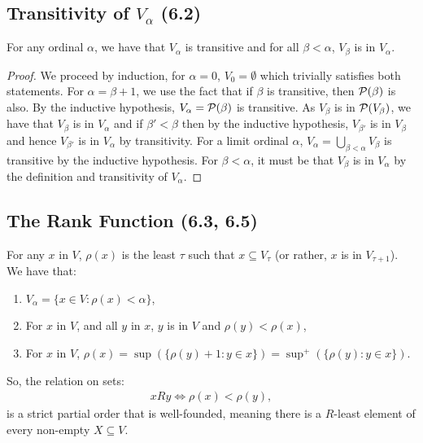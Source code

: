 \subsection{Transitivity of $V_\alpha$ (6.2)} \label{6.2}

For any ordinal $\alpha$, we have that $V_\alpha$ is transitive and for all
$\beta < \alpha$, $V_\beta$ is in $V_\alpha$.

\begin{proof}
    We proceed by induction, for $\alpha = 0$, $V_0 = \emptyset$
    which trivially satisfies both statements. For $\alpha = \beta + 1$,
    we use the fact that if $\beta$ is transitive, then $\mathcal{P}(\beta)$
    is also. By the inductive hypothesis, $V_\alpha = \mathcal{P}(\beta)$
    is transitive. As $V_\beta$ is in $\mathcal{P}(V_\beta)$, we have that
    $V_\beta$ is in $V_\alpha$ and if $\beta' < \beta$ then
    by the inductive hypothesis, $V_{\beta'}$ is in $V_{\beta}$ and
    hence $V_{\beta'}$ is in $V_\alpha$ by transitivity. 
    For a limit ordinal $\alpha$,
    $V_\alpha = \bigcup_{\beta < \alpha} V_\beta$ is transitive by
    the inductive hypothesis. For $\beta < \alpha$, it must be that
    $V_\beta$ is in $V_\alpha$ by the definition and transitivity 
    of $V_\alpha$.
\end{proof}

\subsection{The Rank Function (6.3, 6.5)} \label{6.3} \label{6.5}

For any $x$ in $V$, $\rho(x)$ is the least 
$\tau$ such that $x \subseteq V_\tau$ (or rather, $x$ is in $V_{\tau + 1}$). 
We have that: \begin{enumerate}
    \item $V_\alpha = \{x \in V : \rho(x) < \alpha\}$,
    \item For $x$ in $V$, and all $y$ in $x$, $y$ is in $V$ and
        $\rho(y) < \rho(x)$,
    \item For $x$ in $V$, $\rho(x) 
        = \sup(\{\rho(y) + 1 : y \in x\})
        = \sup^+(\{\rho(y) : y \in x\})$.
\end{enumerate} So, the relation on sets: \begin{align*}
    xRy \Longleftrightarrow \rho(x) < \rho(y),
\end{align*} is a strict partial order that is well-founded, meaning
there is a $R$-least element of every non-empty $X \subseteq V$.

